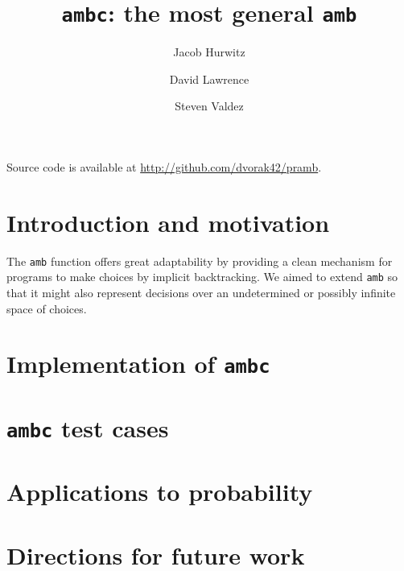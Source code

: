 \documentclass{article}
\title{\texttt{ambc}: the most general \texttt{amb}}
\author{Jacob Hurwitz \and David Lawrence \and Steven Valdez}
\begin{document}
\maketitle

\begin{center}
  Source code is available at \url{http://github.com/dvorak42/pramb}.
\end{center}

\section{Introduction and motivation}

The \texttt{amb} function offers great adaptability by providing a
clean mechanism for programs to make choices by implicit backtracking.
We aimed to extend \texttt{amb} so that it might also represent
decisions over an undetermined or possibly infinite space of choices.

\section{Implementation of \texttt{ambc}}

\section{\texttt{ambc} test cases}

\section{Applications to probability}

\section{Directions for future work}
\end{document}
